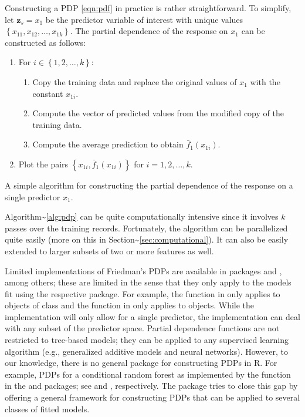 Constructing a PDP \eqref{eqn:pdf} in practice is rather
straightforward. To simplify, let \(\boldsymbol{z}_s = x_1\) be the
predictor variable of interest with unique values
\(\left\{x_{11}, x_{12}, \dots, x_{1k}\right\}\). The partial dependence
of the response on \(x_1\) can be constructed as follows:

\begin{algorithm}
\begin{enumerate}
  \item For $i \in \left\{1, 2, \dots, k\right\}$:
  \begin{enumerate}
    \item Copy the training data and replace the original values of $x_1$ with the constant $x_{1i}$.
    \item Compute the vector of predicted values from the modified copy of the training data.
    \item Compute the average prediction to obtain $\bar{f}_1\left(x_{1i}\right)$.
  \end{enumerate}
  \item Plot the pairs $\left\{x_{1i}, \bar{f}_1\left(x_{1i}\right)\right\}$ for $i = 1, 2, \dotsc, k$.
\end{enumerate}
\caption{A simple algorithm for constructing the partial dependence of the response on a single predictor $x_1$. \label{alg:pdp}}
\end{algorithm}

Algorithm\textasciitilde{}\ref{alg:pdp} can be quite computationally
intensive since it involves \(k\) passes over the training records.
Fortunately, the algorithm can be parallelized quite easily (more on
this in Section\textasciitilde{}\ref{sec:computational}). It can also be
easily extended to larger subsets of two or more features as well.

Limited implementations of Friedman's PDPs are available in packages
 \citep{randomForest-pkg} and 
\citep{gbm-pkg}, among others; these are limited in the sense that they
only apply to the models fit using the respective package. For example,
the  function in  only applies to
objects of class  and the  function in
 only applies to  objects. While the
 implementation will only allow for a single
predictor, the  implementation can deal with any subset of the
predictor space. Partial dependence functions are not restricted to
tree-based models; they can be applied to any supervised learning
algorithm (e.g., generalized additive models and neural networks).
However, to our knowledge, there is no general package for constructing
PDPs in R. For example, PDPs for a conditional random forest as
implemented by the  function in the  and
 packages; see \citet{party-pkg} and
\citet{partykit-pkg}, respectively. The  \citep{pdp-pkg}
package tries to close this gap by offering a general framework for
constructing PDPs that can be applied to several classes of fitted
models.

